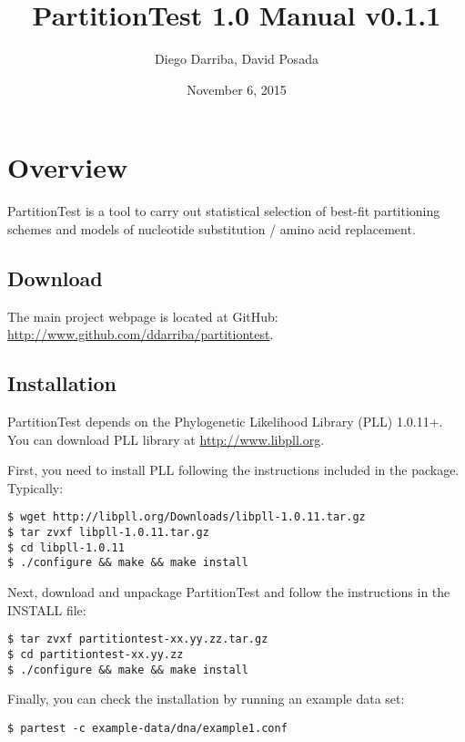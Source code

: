 \documentclass[11pt,twoside,a4paper]{article}
\begin{document}
\providecommand{\versionnumber}{0.1.1}
\title{PartitionTest 1.0 Manual v\versionnumber}
\author{Diego Darriba, David Posada}
\date{November 6, 2015}
\maketitle

\setcounter{tocdepth}{2}
\tableofcontents

\section{Overview}

PartitionTest is a tool to carry out statistical selection of best-fit partitioning schemes and models of nucleotide substitution / amino acid replacement.

\subsection{Download}

The main project webpage is located at GitHub: \url{http://www.github.com/ddarriba/partitiontest}.

\subsection{Installation}

PartitionTest depends on the Phylogenetic Likelihood Library (PLL) 1.0.11+.
You can download PLL library at \url{http://www.libpll.org}.

First, you need to install PLL following the instructions included in the package. Typically:

\begin{verbatim}
$ wget http://libpll.org/Downloads/libpll-1.0.11.tar.gz
$ tar zvxf libpll-1.0.11.tar.gz
$ cd libpll-1.0.11
$ ./configure && make && make install
\end{verbatim}

Next, download and unpackage PartitionTest and follow the instructions in the INSTALL file:

\begin{verbatim}
$ tar zvxf partitiontest-xx.yy.zz.tar.gz
$ cd partitiontest-xx.yy.zz
$ ./configure && make && make install
\end{verbatim}

Finally, you can check the installation by running an example data set:

\begin{verbatim}
$ partest -c example-data/dna/example1.conf
\end{verbatim}
\end{document}
